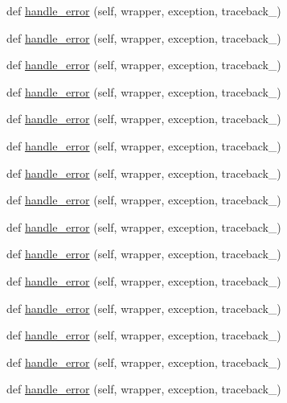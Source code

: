 \begin{DoxyCompactItemize}
\item 
def \hyperlink{classmodulegen____gcc__LP64_1_1ErrorHandler_ae861af2ccf0c7d1732eb52c22d89f8fd}{handle\+\_\+error} (self, wrapper, exception, traceback\+\_\+)
\item 
def \hyperlink{classmodulegen____gcc__LP64_1_1ErrorHandler_ae861af2ccf0c7d1732eb52c22d89f8fd}{handle\+\_\+error} (self, wrapper, exception, traceback\+\_\+)
\item 
def \hyperlink{classmodulegen____gcc__LP64_1_1ErrorHandler_ae861af2ccf0c7d1732eb52c22d89f8fd}{handle\+\_\+error} (self, wrapper, exception, traceback\+\_\+)
\item 
def \hyperlink{classmodulegen____gcc__LP64_1_1ErrorHandler_ae861af2ccf0c7d1732eb52c22d89f8fd}{handle\+\_\+error} (self, wrapper, exception, traceback\+\_\+)
\item 
def \hyperlink{classmodulegen____gcc__LP64_1_1ErrorHandler_ae861af2ccf0c7d1732eb52c22d89f8fd}{handle\+\_\+error} (self, wrapper, exception, traceback\+\_\+)
\item 
def \hyperlink{classmodulegen____gcc__LP64_1_1ErrorHandler_ae861af2ccf0c7d1732eb52c22d89f8fd}{handle\+\_\+error} (self, wrapper, exception, traceback\+\_\+)
\item 
def \hyperlink{classmodulegen____gcc__LP64_1_1ErrorHandler_ae861af2ccf0c7d1732eb52c22d89f8fd}{handle\+\_\+error} (self, wrapper, exception, traceback\+\_\+)
\item 
def \hyperlink{classmodulegen____gcc__LP64_1_1ErrorHandler_ae861af2ccf0c7d1732eb52c22d89f8fd}{handle\+\_\+error} (self, wrapper, exception, traceback\+\_\+)
\item 
def \hyperlink{classmodulegen____gcc__LP64_1_1ErrorHandler_ae861af2ccf0c7d1732eb52c22d89f8fd}{handle\+\_\+error} (self, wrapper, exception, traceback\+\_\+)
\item 
def \hyperlink{classmodulegen____gcc__LP64_1_1ErrorHandler_ae861af2ccf0c7d1732eb52c22d89f8fd}{handle\+\_\+error} (self, wrapper, exception, traceback\+\_\+)
\item 
def \hyperlink{classmodulegen____gcc__LP64_1_1ErrorHandler_ae861af2ccf0c7d1732eb52c22d89f8fd}{handle\+\_\+error} (self, wrapper, exception, traceback\+\_\+)
\item 
def \hyperlink{classmodulegen____gcc__LP64_1_1ErrorHandler_ae861af2ccf0c7d1732eb52c22d89f8fd}{handle\+\_\+error} (self, wrapper, exception, traceback\+\_\+)
\item 
def \hyperlink{classmodulegen____gcc__LP64_1_1ErrorHandler_ae861af2ccf0c7d1732eb52c22d89f8fd}{handle\+\_\+error} (self, wrapper, exception, traceback\+\_\+)
\item 
def \hyperlink{classmodulegen____gcc__LP64_1_1ErrorHandler_ae861af2ccf0c7d1732eb52c22d89f8fd}{handle\+\_\+error} (self, wrapper, exception, traceback\+\_\+)
\item 
def \hyperlink{classmodulegen____gcc__LP64_1_1ErrorHandler_ae861af2ccf0c7d1732eb52c22d89f8fd}{handle\+\_\+error} (self, wrapper, exception, traceback\+\_\+)
\end{DoxyCompactItemize}


